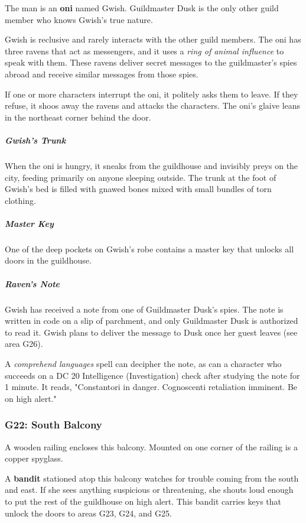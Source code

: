 \documentclass[10pt,a4paper,twoside,bg=print,twocolumn,openany,nodeprecatedcode]{dndbook}
\begin{document}
The man is an \textbf{oni} named Gwish. Guildmaster Dusk is the only other guild member who knows Gwish's true nature.

Gwish is reclusive and rarely interacts with the other guild members. The oni has three ravens that act as messengers, and it uses a \textit{ring of animal influence} to speak with them. These ravens deliver secret messages to the guildmaster's spies abroad and receive similar messages from those spies.

If one or more characters interrupt the oni, it politely asks them to leave. If they refuse, it shoos away the ravens and attacks the characters. The oni's glaive leans in the northeast corner behind the door.

\subparagraph{Gwish's Trunk}
When the oni is hungry, it sneaks from the guildhouse and invisibly preys on the city, feeding primarily on anyone sleeping outside. The trunk at the foot of Gwish's bed is filled with gnawed bones mixed with small bundles of torn clothing.

\subparagraph{Master Key}
One of the deep pockets on Gwish's robe contains a master key that unlocks all doors in the guildhouse.

\subparagraph{Raven's Note}
Gwish has received a note from one of Guildmaster Dusk's spies. The note is written in code on a slip of parchment, and only Guildmaster Dusk is authorized to read it. Gwish plans to deliver the message to Dusk once her guest leaves (see area G26).

A \textit{comprehend languages} spell can decipher the note, as can a character who succeeds on a DC 20 Intelligence (Investigation) check after studying the note for 1 minute. It reads, "Constantori in danger. Cognoscenti retaliation imminent. Be on high alert."

\subsubsection{G22: South Balcony}
\begin{DndReadAloud}{}
A wooden railing encloses this balcony. Mounted on one corner of the railing is a copper spyglass.

\end{DndReadAloud}

A \textbf{bandit} stationed atop this balcony watches for trouble coming from the south and east. If she sees anything suspicious or threatening, she shouts loud enough to put the rest of the guildhouse on high alert. This bandit carries keys that unlock the doors to areas G23, G24, and G25.
\end{document}

